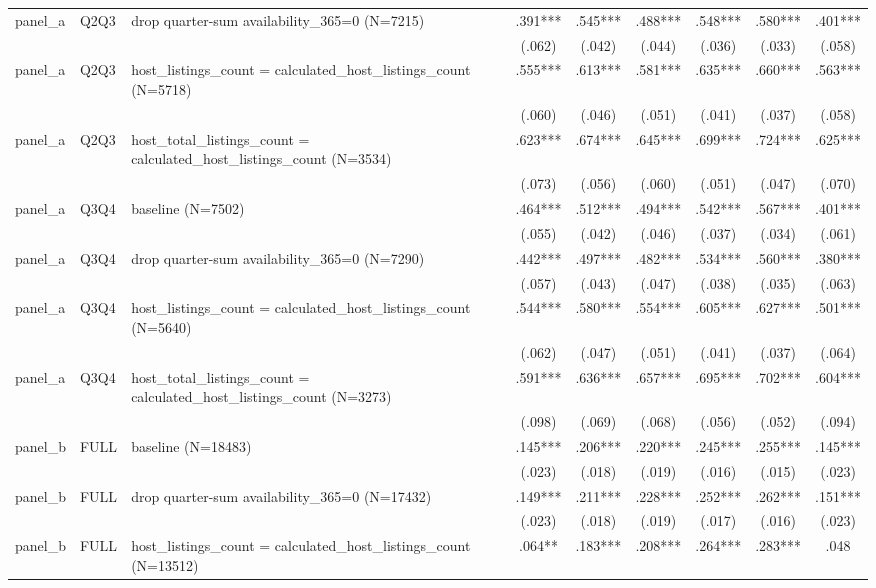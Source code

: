 \begin{tabular}{lllcccccc}
\\
panel\_a & Q2Q3 & drop quarter-sum availability\_365=0 (N=7215) & .391*** & .545*** & .488*** & .548*** & .580*** & .401***
\\
 &  &  & (.062) & (.042) & (.044) & (.036) & (.033) & (.058)
\\
panel\_a & Q2Q3 & host\_listings\_count = calculated\_host\_listings\_count (N=5718) & .555*** & .613*** & .581*** & .635*** & .660*** & .563***
\\
 &  &  & (.060) & (.046) & (.051) & (.041) & (.037) & (.058)
\\
panel\_a & Q2Q3 & host\_total\_listings\_count = calculated\_host\_listings\_count (N=3534) & .623*** & .674*** & .645*** & .699*** & .724*** & .625***
\\
 &  &  & (.073) & (.056) & (.060) & (.051) & (.047) & (.070)
\\
panel\_a & Q3Q4 & baseline (N=7502) & .464*** & .512*** & .494*** & .542*** & .567*** & .401***
\\
 &  &  & (.055) & (.042) & (.046) & (.037) & (.034) & (.061)
\\
panel\_a & Q3Q4 & drop quarter-sum availability\_365=0 (N=7290) & .442*** & .497*** & .482*** & .534*** & .560*** & .380***
\\
 &  &  & (.057) & (.043) & (.047) & (.038) & (.035) & (.063)
\\
panel\_a & Q3Q4 & host\_listings\_count = calculated\_host\_listings\_count (N=5640) & .544*** & .580*** & .554*** & .605*** & .627*** & .501***
\\
 &  &  & (.062) & (.047) & (.051) & (.041) & (.037) & (.064)
\\
panel\_a & Q3Q4 & host\_total\_listings\_count = calculated\_host\_listings\_count (N=3273) & .591*** & .636*** & .657*** & .695*** & .702*** & .604***
\\
 &  &  & (.098) & (.069) & (.068) & (.056) & (.052) & (.094)
\\
panel\_b & FULL & baseline (N=18483) & .145*** & .206*** & .220*** & .245*** & .255*** & .145***
\\
 &  &  & (.023) & (.018) & (.019) & (.016) & (.015) & (.023)
\\
panel\_b & FULL & drop quarter-sum availability\_365=0 (N=17432) & .149*** & .211*** & .228*** & .252*** & .262*** & .151***
\\
 &  &  & (.023) & (.018) & (.019) & (.017) & (.016) & (.023)
\\
panel\_b & FULL & host\_listings\_count = calculated\_host\_listings\_count (N=13512) & .064** & .183*** & .208*** & .264*** & .283*** & .048

\end{tabular}
